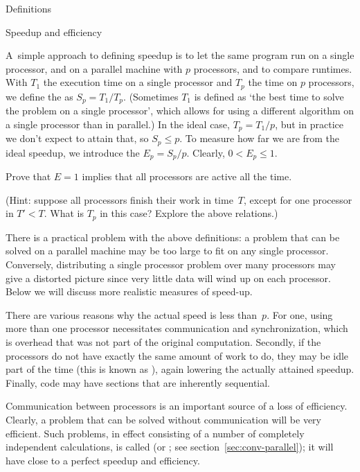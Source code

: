 {Definitions}
\label{sec:speedup}

 {Speedup and efficiency}

A~simple approach to defining speedup is to let the same program run on a
single processor, and on a parallel machine with $p$ processors, and
to compare runtimes.
With $T_1$ the execution time on a single processor and
$T_p$ the time on $p$ processors, we define the  as
$S_p=T_1/T_p$. (Sometimes $T_1$ is defined as `the best time to solve the
problem on a single processor', which allows for using a different
algorithm on a single processor than in parallel.)
In the ideal case, $T_p=T_1/p$, but in practice we don't expect to
attain that, so $S_p\leq p$. To measure how far we are from the ideal
speedup, we introduce the  $E_p=S_p/p$. Clearly,
$0< E_p\leq 1$.

\begin{exercise}
  Prove that $E=1$ implies that all processors are active all the time.

  (Hint: suppose all processors finish their work in time~$T$,
  except for one processor in $T'<T$. What is $T_p$ in this case?
  Explore the above relations.)
\end{exercise}

There is a practical problem with
the above definitions: a problem that can be solved on a parallel machine
may be too large to fit on any single processor. Conversely,
distributing a single processor problem
over many processors may give a distorted picture since very little
data will wind up on each processor. Below we will discuss more
realistic measures of speed-up.

There are various reasons why the actual speed is less than~$p$. For
one, using more than one processor necessitates communication
and synchronization, which
is overhead that was not part of the original computation. Secondly,
if the processors do not have exactly the same amount of work to do,
they may be idle part of the time (this is known as
), again lowering the actually attained
speedup. Finally, code may have sections that are inherently
sequential.

Communication between processors is an important source of a loss of
efficiency. Clearly, a problem that can be solved without
communication will be very efficient. Such problems, in effect
consisting of a number of completely independent calculations, is
called 
(or ; see section~\ref{sec:conv-parallel});
it will have close to a perfect speedup and efficiency.

